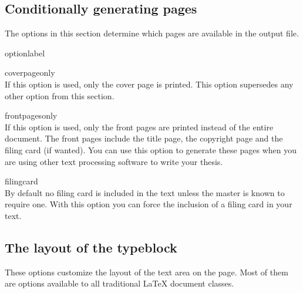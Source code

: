 \subsection{Conditionally generating pages}
The options in this section determine which pages are available in the
output file.

\begin{labelled}{optionlabel}
\item[coverpageonly]\\
  If this option is used, only the cover page is printed. This option
  supersedes any other option from this section.

\item[frontpagesonly]\\
  If this option is used, only the front pages are printed instead of the
  entire document. The front pages include the title page, the copyright
  page and the filing card (if wanted). You can use this option to generate
  these pages when you are using other text processing software to write
  your thesis.

\item[filingcard]\\
  By default no filing card is included in the text unless the master is
  known to require one. With this option you can force the inclusion of a
  filing card in your text.
\end{labelled}

\subsection{The layout of the typeblock}
These options customize the layout of the text area on the page. Most of
them are options available to all traditional LaTeX document classes.

